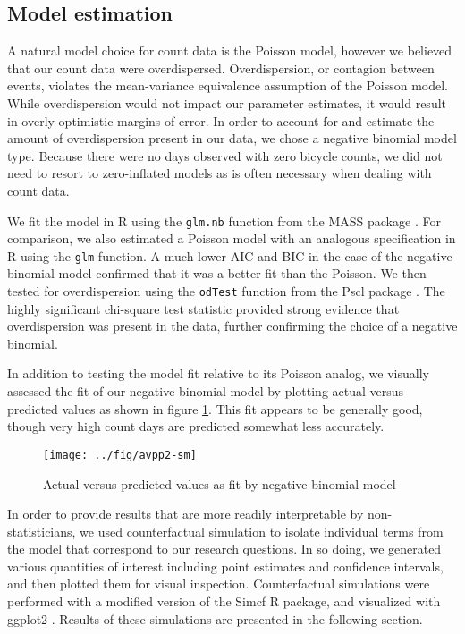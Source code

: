 \documentclass[12pt,letterpaper,article,twocolumn]{memoir}
\begin{document}
\subsection*{Model estimation}
A natural model choice for count data is the Poisson model, however we
believed that our count data were overdispersed. Overdispersion, or
contagion between events, violates the mean-variance equivalence
assumption of the Poisson model. While overdispersion would not impact
our parameter estimates, it would result in overly optimistic margins
of error. In order to account for and estimate the amount of
overdispersion present in our data, we chose a negative binomial model
type. Because there were no days observed with zero bicycle counts, we
did not need to resort to zero-inflated models as is often necessary
when dealing with count data.

We fit the model in R using the \texttt{glm.nb} function from the MASS
package \parencite{Venables:2002aa}. For comparison, we also estimated a
Poisson model with an analogous specification in R using the
\texttt{glm} function. A much lower AIC and BIC in the case of the
negative binomial model confirmed that it was a better fit than the
Poisson. We then tested for overdispersion using the \texttt{odTest} function
from the Pscl package \parencite{Jackman:2014aa}. The highly significant
chi-square test statistic provided strong evidence that overdispersion
was present in the data, further confirming the choice of a negative
binomial.

In addition to testing the model fit relative to its Poisson
analog, we visually assessed the fit of our negative binomial model by
plotting actual versus predicted values as shown in figure
\ref{fg:avp}. This fit appears to be generally good, though very high
count days are predicted somewhat less accurately.

\begin{figure}[h!]
  \centering
  \texttt{[image: ../fig/avpp2-sm]}
  \caption{Actual versus predicted values as fit by negative binomial model}
  \label{fg:avp}
\end{figure}

In order to provide results that are more readily interpretable by
non-statisticians, we used counterfactual simulation to isolate
individual terms from the model that correspond to our research
questions. In so doing, we generated various quantities of interest
including point estimates and confidence intervals, and then plotted
them for visual inspection. Counterfactual simulations were performed
with a modified version of the Simcf R package, and visualized with
ggplot2 \parencite{Adolph:2014aa,Schmiedeskamp:aa,Wickham:2009aa}.
Results of these simulations are presented in the following section.
\end{document}
